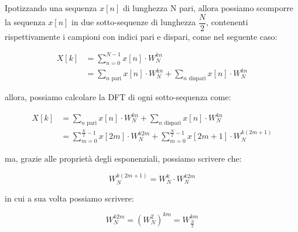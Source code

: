 Ipotizzando una sequenza $x \left[ n\right]$ di lunghezza N pari, allora possiamo scomporre la sequenza $x \left[ n \right]$ in due sotto-sequenze di lunghezza $\dfrac{N}{2}$, 
contenenti rispettivamente i campioni con indici pari e dispari, come nel seguente caso: 

{
    \Large 
    \begin{equation}
        \begin{split}
        X \left[ k\right]
        &= 
        \sum_{n = 0}^{N - 1}
        x \left[ n\right]
        \cdot 
        W_{N}^{kn}
        \\
        &= 
        \sum_{n \text{ pari}}
        x \left[ n\right]
        \cdot 
        W_{N}^{kn} 
        + 
        \sum_{n \text{ dispari}}
        x \left[ n\right]
        \cdot 
        W_{N}^{kn}       
        \end{split}
    \end{equation}
}

allora, possiamo calcolare la DFT di ogni sotto-sequenza come: 

\newpage 

{
    \Large 
    \begin{equation}
        \begin{split}
        X \left[ k\right]
        &= 
        \sum_{n \text{ pari}}
        x \left[ n\right]
        \cdot 
        W_{N}^{kn} 
        + 
        \sum_{n \text{ dispari}}
        x \left[ n\right]
        \cdot 
        W_{N}^{kn}       
        \\
        &= 
        \sum_{m = 0}^{\frac{N}{2} - 1}
        x \left[ 2m\right]
        \cdot 
        W_{N}^{k2m} 
        + 
        \sum_{m = 0}^{\frac{N}{2} - 1}
        x \left[ 2m + 1\right]
        \cdot 
        W_{N}^{k \left( 2m + 1\right)} 
        \end{split}
    \end{equation}
}

ma, grazie alle proprietà degli esponenziali, possiamo scrivere che: 

{
    \Large 
    \begin{equation}
        W_{N}^{k \left(2 m + 1\right)}
        = 
        W_{N}^{k} \cdot W_{N}^{k 2m}
    \end{equation}
}

in cui a sua volta possiamo scrivere: 

{
    \Large 
    \begin{equation}
        W_{N}^{k 2 m}
        = 
        \left( W_{N}^{2} \right)^{km}
        = 
        W_{\frac{N}{2}}^{km} 
    \end{equation}
} 

